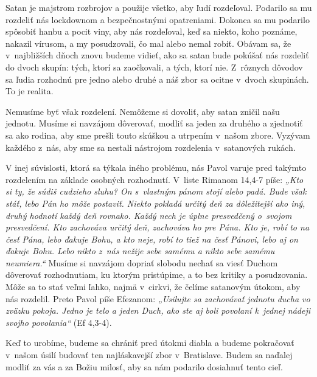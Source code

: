 


Satan je majstrom rozbrojov a použije všetko, aby ľudí rozdeľoval. Podarilo sa mu rozdeliť nás lockdownom a bezpečnostnými opatreniami. Dokonca sa mu podarilo spôsobiť hanbu a pocit viny, aby nás rozdeľoval, keď sa niekto, koho poznáme, nakazil vírusom, a my posudzovali, čo mal alebo nemal robiť. Obávam sa, že v~najbližších dňoch znovu budeme vidieť, ako sa satan bude pokúšať nás rozdeliť do dvoch skupín: tých, ktorí sa zaočkovali, a tých, ktorí nie. Z~rôznych dôvodov sa ľudia rozhodnú pre jedno alebo druhé a náš zbor sa ocitne v~dvoch skupinách. To je realita.

Nemusíme byť však rozdelení. Nemôžeme si dovoliť, aby satan zničil našu jednotu. Musíme si navzájom dôverovať, modliť sa jeden za druhého a zjednotiť sa ako rodina, aby sme prešli touto skúškou a utrpením v~našom zbore. Vyzývam každého z~nás, aby sme sa nestali nástrojom rozdelenia v~satanových rukách.

V inej súvislosti, ktorá sa týkala iného problému, nás Pavol varuje pred takýmto rozdelením na základe osobných rozhodnutí. V~liste Rimanom 14,4-7 píše: {\it „Kto si ty, že súdiš cudzieho sluhu? On s~vlastným pánom stojí alebo padá. Bude však stáť, lebo Pán ho môže postaviť.  Niekto pokladá určitý deň za dôležitejší ako iný, druhý hodnotí každý deň rovnako. Každý nech je úplne presvedčený o~svojom presvedčení. Kto zachováva určitý deň, zachováva ho pre Pána. Kto je, robí to na česť Pána, lebo ďakuje Bohu, a kto neje, robí to tiež na česť Pánovi, lebo aj on ďakuje Bohu. Lebo nikto z~nás nežije sebe samému a nikto sebe samému neumiera.“} Musíme si navzájom dopriať slobodu nechať sa viesť Duchom dôverovať rozhodnutiam, ku ktorým pristúpime, a to bez kritiky a posudzovania. Môže sa to stať veľmi ľahko, najmä v~cirkvi, že čelíme satanovým útokom, aby nás rozdelil. Preto Pavol píše Efezanom: {\it „Usilujte sa zachovávať jednotu ducha vo zväzku pokoja. Jedno je telo a jeden Duch, ako ste aj boli povolaní k~jednej nádeji svojho povolania“} (Ef 4,3-4).

Keď to urobíme, budeme sa chrániť pred útokmi diabla a budeme pokračovať v~našom úsilí budovať ten najláskavejší zbor v~Bratislave. Budem sa naďalej modliť za vás a za Božiu milosť, aby sa nám podarilo dosiahnuť tento cieľ.

